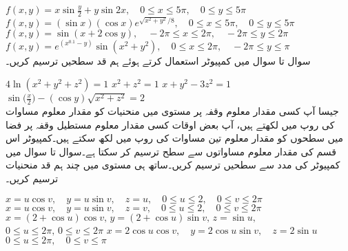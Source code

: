 $f(x,y)=x\sin\tfrac{y}{2}+y\sin 2x,\quad 0\le x\le 5\pi,\quad 0\le y\le 5\pi$
$f(x,y)=(\sin x)(\cos x)e^{\sqrt{x^2+y^2}/8},\quad 0\le x\le 5\pi,\quad 0\le y\le 5\pi$
$f(x,y)=\sin(x+2\cos y),\quad -2\pi\le x\le 2\pi,\quad -2\pi\le y\le 2\pi$
$f(x,y)=e^{(x^{0.1}-y)}\sin (x^2+y^2),\quad 0\le x\le 2\pi,\quad -2\pi\le y\le \pi$
\\
سوال  تا سوال  میں کمپیوٹر استعمال کرتے ہوئے ہم قد سطحیں  ترسیم کریں۔

$4\ln(x^2+y^2+z^2)=1$
$x^2+z^2=1$
$x+y^2-3z^2=1$
$\sin\big(\frac{x}{2}\big)-(\cos y)\sqrt{x^2+z^2}=2$
\\
جیسا آپ کسی مقدار معلوم وقفہ  پر  مستوی میں منحنیات کو مقدار معلوم مساوات  کی    روپ میں لکھتے ہیں، آپ بعض اوقات کسی مقدار معلوم مستطیل وقفہ  پر  فضا میں سطحوں کو    مقدار معلوم تین مساوات   کی روپ میں لکھ سکتے ہیں۔کمپیوٹر اس قسم کی مقدار معلوم مساواتوں سے سطح  ترسیم کر سکتا ہے۔سوال  تا سوال  میں کمپیوٹر کی مدد سے سطحیں ترسیم کریں۔ساتھ ہی  مستوی میں چند ہم قد منحنیات ترسیم کریں۔

$x=u\cos v,\quad y=u\sin v,\quad z=u,\quad 0\le u\le 2,\quad 0\le v\le 2\pi$
$x=u\cos v,\quad y=u\sin v,\quad z=v,\quad 0\le u\le 2,\quad 0\le v\le 2\pi$
$x=(2+\cos u)\cos v,\,y=(2+\cos u)\sin v,\, z=\sin u,$\\
$ 0\le u\le 2\pi,\, 0\le v\le 2\pi$
$x=2\cos u\cos v,\quad y=2\cos u\sin v,\quad z=2\sin u$\\
$0\le u\le 2\pi,\quad 0\le v\le \pi$

